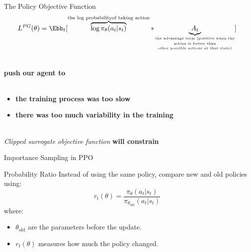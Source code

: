 \documentclass[aspectratio=169,xcolor=dvipsnames,svgnames,x11names,fleqn]{beamer}
\begin{document}
\begin{frame}{ The Policy Objective Function}
    $$
    L^{PG}(\theta) = \Ebb_t[\overbrace{\log \pi_\theta(a_t|s_t)}^{\text{the log probability}\\\text{of taking action}} * \underbrace{A_t}_{\tiny\shortstack{\text{the advantage term (positive when the}\\\text{action is better than}\\\text{other possible actions at that state)}}}]
    $$
\footnotesize

     \\
 \textbf{push our agent to} \\
 \\
\begin{itemize}
    \item {} \textbf{the training process was too slow} \\
    \item {} \textbf{there was too much variability in the training}
\end{itemize}
 \\
 \textit{Clipped surrogate objective function}  \textbf{will constrain} \\

\end{frame}

\begin{frame}{Importance Sampling in PPO}
    \begin{tblock}{Probability Ratio}
        Instead of using the same policy, compare new and old policies using:
        \[
        r_t(\theta) = \frac{\pi_\theta(a_t | s_t)}{\pi_{\theta_{\text{old}}}(a_t | s_t)}
        \]
        where:
        \begin{itemize}
            \item $\theta_{\text{old}}$ are the parameters before the update.
            \item $r_t(\theta)$ measures how much the policy changed.
        \end{itemize}
    \end{tblock}
\end{frame}
\end{document}
